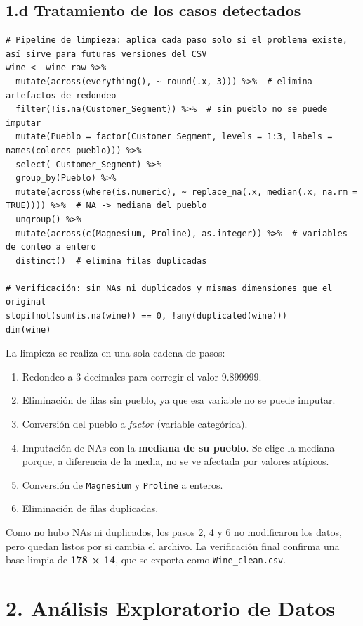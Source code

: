\documentclass[10pt,letterpaper,twocolumn]{article}
\newcommand{\var}[1]{\texttt{#1}}
\begin{document}
\subsection{1.d Tratamiento de los casos detectados}

\begin{lstlisting}[firstnumber=137]
# Pipeline de limpieza: aplica cada paso solo si el problema existe, así sirve para futuras versiones del CSV
wine <- wine_raw %>%
  mutate(across(everything(), ~ round(.x, 3))) %>%  # elimina artefactos de redondeo
  filter(!is.na(Customer_Segment)) %>%  # sin pueblo no se puede imputar
  mutate(Pueblo = factor(Customer_Segment, levels = 1:3, labels = names(colores_pueblo))) %>%
  select(-Customer_Segment) %>%
  group_by(Pueblo) %>%
  mutate(across(where(is.numeric), ~ replace_na(.x, median(.x, na.rm = TRUE)))) %>%  # NA -> mediana del pueblo
  ungroup() %>%
  mutate(across(c(Magnesium, Proline), as.integer)) %>%  # variables de conteo a entero
  distinct()  # elimina filas duplicadas

# Verificación: sin NAs ni duplicados y mismas dimensiones que el original
stopifnot(sum(is.na(wine)) == 0, !any(duplicated(wine)))
dim(wine)
\end{lstlisting}

La limpieza se realiza en una sola cadena de pasos:
\begin{enumerate}
  \item Redondeo a 3 decimales para corregir el valor 9.899999.
  \item Eliminación de filas sin pueblo, ya que esa variable no se puede imputar.
  \item Conversión del pueblo a \textit{factor} (variable categórica).
  \item Imputación de NAs con la \textbf{mediana de su pueblo}. Se elige la mediana porque, a diferencia de la media, no se ve afectada por valores atípicos.
  \item Conversión de \var{Magnesium} y \var{Proline} a enteros.
  \item Eliminación de filas duplicadas.
\end{enumerate}
Como no hubo NAs ni duplicados, los pasos 2, 4 y 6 no modificaron los datos, pero quedan listos por si cambia el archivo. La verificación final confirma una base limpia de \textbf{178 × 14}, que se exporta como \var{Wine\_clean.csv}.

\section{2. Análisis Exploratorio de Datos}
\end{document}
